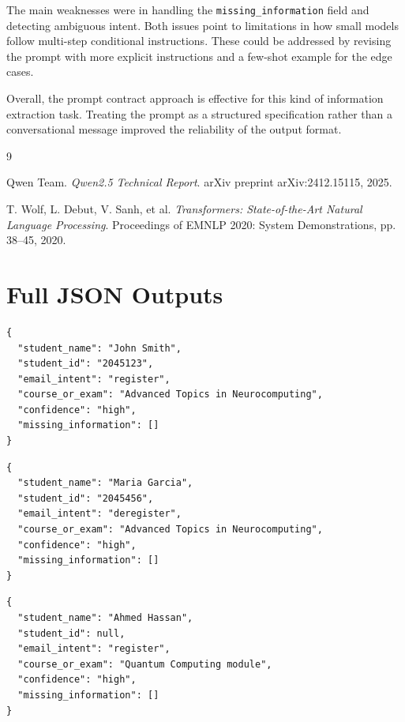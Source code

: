 \documentclass[11pt,a4paper]{article}
\begin{document}
The main weaknesses were in handling the \texttt{missing\_information} field and detecting ambiguous intent. Both issues point to limitations in how small models follow multi-step conditional instructions. These could be addressed by revising the prompt with more explicit instructions and a few-shot example for the edge cases.

Overall, the prompt contract approach is effective for this kind of information extraction task. Treating the prompt as a structured specification rather than a conversational message improved the reliability of the output format.

\begin{thebibliography}{9}

Qwen Team.
\textit{Qwen2.5 Technical Report}.
arXiv preprint arXiv:2412.15115, 2025.

T. Wolf, L. Debut, V. Sanh, et al.
\textit{Transformers: State-of-the-Art Natural Language Processing}.
Proceedings of EMNLP 2020: System Demonstrations, pp. 38--45, 2020.

\end{thebibliography}

\appendix

\section{Full JSON Outputs}

\begin{lstlisting}[caption={Email 1 -- Clear registration request}]
{
  "student_name": "John Smith",
  "student_id": "2045123",
  "email_intent": "register",
  "course_or_exam": "Advanced Topics in Neurocomputing",
  "confidence": "high",
  "missing_information": []
}
\end{lstlisting}

\begin{lstlisting}[caption={Email 2 -- Clear deregistration request}]
{
  "student_name": "Maria Garcia",
  "student_id": "2045456",
  "email_intent": "deregister",
  "course_or_exam": "Advanced Topics in Neurocomputing",
  "confidence": "high",
  "missing_information": []
}
\end{lstlisting}

\begin{lstlisting}[caption={Email 3 -- Missing student ID}]
{
  "student_name": "Ahmed Hassan",
  "student_id": null,
  "email_intent": "register",
  "course_or_exam": "Quantum Computing module",
  "confidence": "high",
  "missing_information": []
}
\end{lstlisting}
\end{document}
